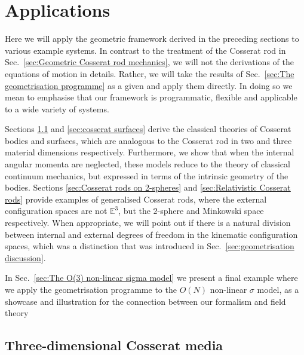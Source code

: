 \section{Applications} \label{sec:geometrisation applications}

Here we will apply the geometric framework derived in the preceding sections to various example systems. In contrast to the treatment of the Cosserat rod in Sec.~\ref{sec:Geometric Cosserat rod mechanics}, we will not the derivations of the equations of motion in details. Rather, we will take the results of Sec.~\ref{sec:The geometrisation programme} as a given and apply them directly. In doing so we mean to emphasise that our framework is programmatic, flexible and applicable to a wide variety of systems.

Sections \ref{sec:cosserat 3d bodies} and \ref{sec:cosserat surfaces} derive the classical theories of Cosserat bodies and surfaces, which are analogous to the Cosserat rod in two and three material dimensions respectively. Furthermore, we show that when the internal angular momenta are neglected, these models reduce to the theory of classical continuum mechanics, but expressed in terms of the intrinsic geometry of the bodies. Sections \ref{sec:Cosserat rods on 2-spheres} and \ref{sec:Relativistic Cosserat rods} provide examples of generalised Cosserat rods, where the external configuration spaces are not $\mathbb{E}^3$, but the $2$-sphere and Minkowski space respectively. When appropriate, we will point out if there is a natural division between internal and external degrees of freedom in the kinematic configuration spaces, which was a distinction that was introduced in Sec.~\ref{sec:geometrisation discussion}.

In Sec.~\ref{sec:The O(3) non-linear sigma model} we present a final example where we apply the geometrisation programme to the $O(N)$ non-linear $\sigma$ model, as a showcase and illustration for the connection between our formalism and field theory


\subsection{Three-dimensional Cosserat media}  \label{sec:cosserat 3d bodies}

